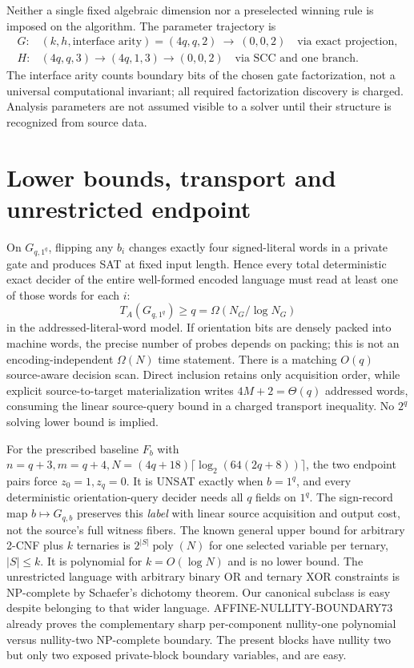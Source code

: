 \documentclass[11pt]{article}
\begin{document}
Neither a single fixed algebraic dimension nor a
preselected winning rule is imposed on the algorithm.
The parameter trajectory is
\[
\begin{array}{ll}
G:&(k,h,\text{interface arity})=(4q,q,2)
\ \longrightarrow\ (0,0,2)\quad\text{via exact projection},\\
H:&(4q,q,3)\longrightarrow(4q,1,3)
\longrightarrow(0,0,2)\quad\text{via SCC and one branch}.
\end{array}
\tag{12}
\]
The interface arity counts boundary bits of the
chosen gate factorization, not a universal computational
invariant; all required factorization discovery is charged.
Analysis parameters are not assumed visible to a solver
until their structure is recognized from source data.

\section{Lower bounds, transport and unrestricted endpoint}
On $G_{q,1^q}$, flipping any $b_i$ changes exactly four
signed-literal words in a private gate and produces SAT
at fixed input length. Hence every total deterministic
exact decider of the entire well-formed encoded language
must read at least one of those words for each $i$:
\[
T_A(G_{q,1^q})\ge q=\Omega(N_G/\log N_G)
\tag{13}
\]
in the addressed-literal-word model. If orientation bits
are densely packed into machine words, the precise number
of probes depends on packing; this is not an
encoding-independent $\Omega(N)$ time statement.
There is a matching $O(q)$ source-aware decision scan.
Direct inclusion retains only acquisition order, while
explicit source-to-target materialization writes
$4M+2=\Theta(q)$ addressed words, consuming the
linear source-query bound in a charged transport inequality.
No $2^q$ solving lower bound is implied.

For the prescribed baseline $F_b$ with
$n=q+3,m=q+4,N=(4q+18)\lceil\log_2(64(2q+8))\rceil$,
the two endpoint pairs force $z_0=1,z_q=0$.
It is UNSAT exactly when $b=1^q$, and every
deterministic orientation-query decider needs all $q$
fields on $1^q$. The sign-record map $b\mapsto
G_{q,b}$ preserves this \emph{label} with linear
source acquisition and output cost, not the source's
full witness fibers. The known general upper bound
for arbitrary 2-CNF plus $k$ ternaries is
$2^{|S|}\operatorname{poly}(N)$ for one selected variable
per ternary, $|S|\le k$. It is polynomial for
$k=O(\log N)$ and is no lower bound.
The unrestricted language with arbitrary binary OR
and ternary XOR constraints is NP-complete by
Schaefer's dichotomy theorem. Our canonical subclass
is easy despite belonging to that wider language.
AFFINE-NULLITY-BOUNDARY73 already proves the complementary
sharp per-component nullity-one polynomial versus
nullity-two NP-complete boundary. The present blocks
have nullity two but only two exposed private-block
boundary variables, and are easy.
\end{document}
